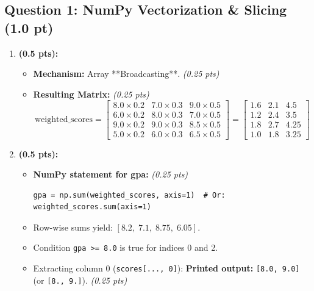 \documentclass[11pt,a4paper]{article}
\begin{document}
\subsection*{Question 1: NumPy Vectorization \& Slicing (1.0 pt)}
\begin{enumerate}[label=\textbf{\alph*)}]
  \item \textbf{(0.5 pts):}
  \begin{itemize}
    \item \textbf{Mechanism:} Array **Broadcasting**. \textit{(0.25 pts)}
    \item \textbf{Resulting Matrix:} \textit{(0.25 pts)}
    $$\text{weighted\_scores} = \begin{bmatrix}
      8.0\times 0.2 & 7.0\times 0.3 & 9.0\times 0.5 \\
      6.0\times 0.2 & 8.0\times 0.3 & 7.0\times 0.5 \\
      9.0\times 0.2 & 9.0\times 0.3 & 8.5\times 0.5 \\
      5.0\times 0.2 & 6.0\times 0.3 & 6.5\times 0.5
    \end{bmatrix} = \begin{bmatrix}
      1.6 & 2.1 & 4.5 \\
      1.2 & 2.4 & 3.5 \\
      1.8 & 2.7 & 4.25 \\
      1.0 & 1.8 & 3.25
    \end{bmatrix}$$
  \end{itemize}

  \item \textbf{(0.5 pts):}
  \begin{itemize}
    \item \textbf{NumPy statement for gpa:} \textit{(0.25 pts)}
\begin{lstlisting}
gpa = np.sum(weighted_scores, axis=1)  # Or: weighted_scores.sum(axis=1)
\end{lstlisting}
    \item Row-wise sums yield: $[8.2, \; 7.1, \; 8.75, \; 6.05]$.
    \item Condition \texttt{gpa >= 8.0} is true for indices 0 and 2.
    \item Extracting column 0 (\texttt{scores[..., 0]}): \textbf{Printed output:} \texttt{[8.0, 9.0]} (or \texttt{[8., 9.]}). \textit{(0.25 pts)}
  \end{itemize}
\end{enumerate}
\end{document}
